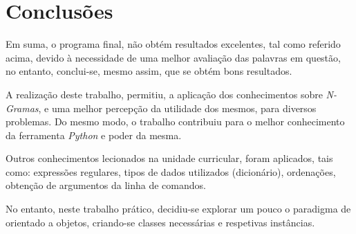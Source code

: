 \documentclass[11pt,a4paper]{report}%
\begin{document}
\section{Conclusões}
\hspace{5mm} Em suma, o programa final, não obtém resultados excelentes, tal como referido acima, devido à necessidade de uma melhor avaliação das palavras em questão, no entanto, conclui-se, mesmo assim, que se obtém bons resultados. 

\hspace{5mm}A realização deste trabalho, permitiu, a aplicação dos conhecimentos sobre \textit{N-Gramas}, e uma melhor percepção da utilidade dos mesmos, para diversos problemas. Do mesmo modo, o trabalho contribuiu para o melhor conhecimento da ferramenta \textit{Python} e poder da mesma.

\hspace{5mm} Outros conhecimentos lecionados na unidade curricular, foram aplicados, tais como: expressões regulares, tipos de dados utilizados (dicionário), ordenações, obtenção de argumentos da linha de comandos. 

\hspace{5mm} No entanto, neste trabalho prático, decidiu-se explorar um pouco o paradigma de orientado a objetos, criando-se classes necessárias e respetivas instâncias.
\end{document}
